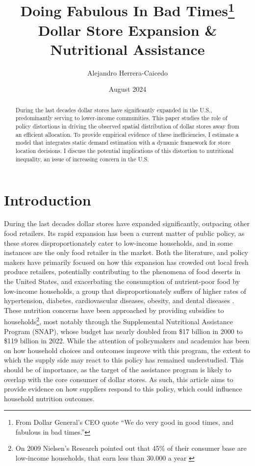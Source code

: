 \documentclass[11.5pt]{article}
\title{Doing Fabulous In Bad Times\footnote{From Dollar General's CEO quote ``We do very good in good times, and fabulous in bad times.''} \\ Dollar Store Expansion \& Nutritional Assistance}
\author{Alejandro Herrera-Caicedo }
\date{August 2024}
\begin{document}
\maketitle
\begin{abstract}
    During the last decades dollar stores have significantly expanded in the U.S., predominantly serving to lower-income communities. This paper studies the role of policy distortions in driving the observed spatial distribution of dollar stores away from an efficient allocation. To provide empirical evidence of these inefficiencies, I estimate a model that integrates static demand estimation with a dynamic framework for store location decisions. I discuss the potential implications of this distortion to nutritional inequality, an issue of increasing concern in the U.S.
    
    
\end{abstract}


\section{Introduction}



During the last decades dollar stores have expanded significantly, outpacing other food retailers. Its rapid expansion has been a current matter of public policy, as these stores disproportionately cater to low-income households, and in some instances are the only food retailer in the market. Both the literature, and policy makers have primarily focused on how this expansion has crowded out local fresh produce retailers, potentially contributing to the phenomena of food deserts in the United States, and exacerbating the consumption of nutrient-poor food by low-income households, a group that disproportionately suffers of higher rates of hypertension, diabetes, cardiovascular diseases, obesity, and dental diseases \cite{shenkin2010using}. These nutrition concerns have been approached by providing subsidies to households\footnote{On 2009 Nielsen's Research pointed out that 45\% of their consumer base are low-income households, that earn less than 30.000 a year \cite{nielsen2009dollarstores}}, most notably through the Supplemental Nutritional Assistance Program (SNAP), whose budget has nearly doubled from \$17 billion in 2000 to \$119 billion in 2022. While the attention of policymakers and academics has been on how household choices and outcomes improve with this program, the extent to which the supply side may react to this policy has remained understudied. This should be of importance, as the target of the assistance program is likely to overlap with the core consumer of dollar stores. As such, this article aims to provide evidence on how suppliers respond to this policy, which could influence household nutrition outcomes.
\end{document}
